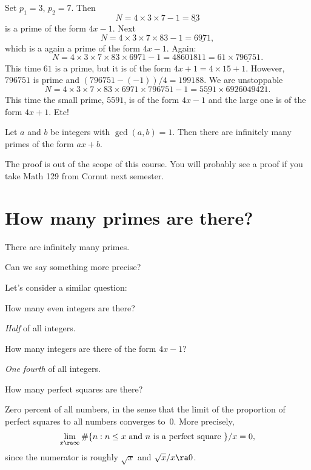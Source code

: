 \documentclass[11pt]{report}
\newcommand{\ul}[1]{\underline{#1}}
\begin{document}
\begin{example}
  Set $p_1=3$, $p_2=7$.   Then
  $$
    N = 4\times 3 \times 7 - 1 = \ul{83}
  $$
  is a prime of the form $4x-1$.
  Next
  $$
    N = 4\times 3 \times 7\times 83 - 1 = \ul{6971},
  $$
  which is a again a prime of the form $4x-1$.
  Again:
  $$
    N = 4\times 3 \times 7\times 83\times 6971 - 1 = 48601811 = 61 \times \ul{796751}.
  $$
  This time $61$ is a prime, but it is of the form $4x+1 = 4\times 15+1$.
  However, $796751$ is prime and $(796751-(-1))/4 = 199188$.
  We are unstoppable
  $$
    N = 4\times 3 \times 7\times 83\times 6971 \times 796751 - 1 = \ul{5591}\times 6926049421.
  $$
  This time the small prime, $5591$, is of the form $4x-1$ and the large
  one is of the form $4x+1$.
  Etc!
\end{example}

\begin{theorem}[Dirichlet]
  Let $a$ and $b$ be integers with $\gcd(a,b)=1$.
  Then there are infinitely many primes of the form
  $ax+b$.
\end{theorem}
The proof is out of the scope of this course.  You will probably see a proof
if you take Math 129 from Cornut next semester.



\section{How many primes are there?}
There are infinitely many primes.

Can we say something more precise?

Let's consider a similar question:\\
\begin{question}
  How many even integers are there?
\end{question}
 {\em Half} of all integers.

\begin{question}
  How many integers are there of the form $4x-1$?
\end{question}
 {\em One fourth} of all integers.

\begin{question}
  How many perfect squares are there?
\end{question}
 Zero percent of all numbers, in the sense that
the limit of the proportion of perfect squares to all numbers
converges to~$0$.
More precisely,
$$\lim_{x\ra \infty}
  \# \{n : n \leq x \text{ and $n$ is a perfect square }\} / x = 0,$$
since the numerator is roughly $\sqrt{x}$ and $\sqrt{x}/x \ra 0$.
\end{document}
